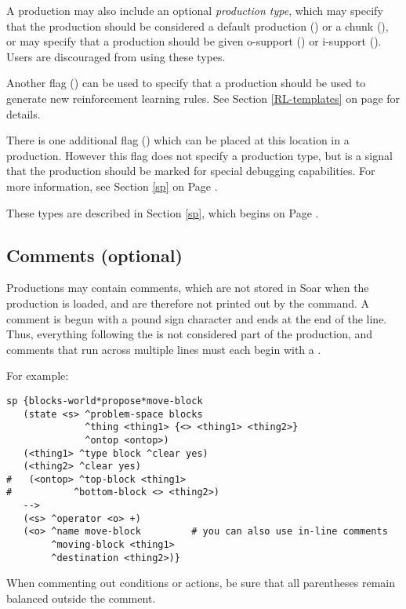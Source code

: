 A production may also include an optional \emph{production type}, which may specify that the production should be considered a default production () or a chunk (), or may specify that a production should be given o-support () or i-support ().  Users are discouraged from using these types.  

Another flag () can be used to specify that a production should be used to generate new reinforcement learning rules. See Section \ref{RL-templates} on page \pageref{RL-templates} for details.

There is one additional flag () which can be placed at this location in a production. However this flag does not specify a production type, but is a signal that the production should be marked for special debugging capabilities. For more information, see Section \ref{sp} on Page \pageref{sp}.

These types are described in Section \ref{sp}, which begins on Page \pageref{sp}.

\subsection{Comments (optional)}

Productions may contain comments, which are not stored in Soar when the production is loaded, and are therefore not printed out by the  command. A comment is begun with a pound sign character \soar{\#} and ends at the end of the line.  Thus, everything following the \soar{\#} is not considered part of the production, and comments that run across multiple lines must each begin with a \soar{\#}.

For example:
\begin{verbatim}
sp {blocks-world*propose*move-block
   (state <s> ^problem-space blocks
              ^thing <thing1> {<> <thing1> <thing2>}
              ^ontop <ontop>)
   (<thing1> ^type block ^clear yes)
   (<thing2> ^clear yes)
#   (<ontop> ^top-block <thing1>
#           ^bottom-block <> <thing2>)
   -->
   (<s> ^operator <o> +)
   (<o> ^name move-block         # you can also use in-line comments
        ^moving-block <thing1>
        ^destination <thing2>)}
\end{verbatim}

When commenting out conditions or actions, be sure that all parentheses remain balanced outside the comment.

